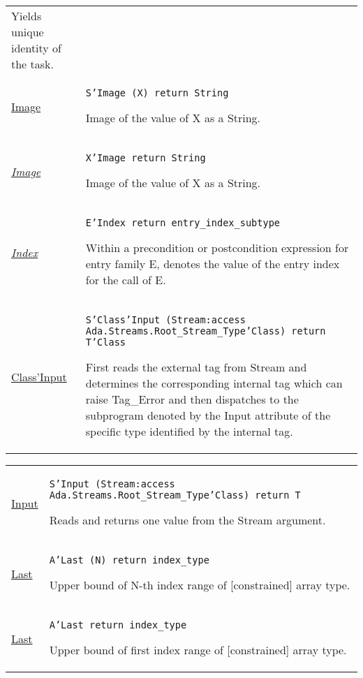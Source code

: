 \documentclass[english]{article}
\begin{document}
\begin{scriptsize}
\begin{multicols*}{3}
\begin{tabular}{@{}p{2cm}p{6.5cm}}
   Yields unique identity of the task.\\

   \href{http://www.ada-auth.org/standards/22rm/html/RM-K-2.html}{Image} & \texttt{S'Image (X) return String}

   Image of the value of X as a String.\\

   \href{http://www.ada-auth.org/standards/22rm/html/RM-K-2.html}{\textit{Image}} & \texttt{X'Image return String}

   Image of the value of X as a String.\\

   \href{http://www.ada-auth.org/standards/22rm/html/RM-K-2.html}{\textit{Index}} & \texttt{E'Index return entry\_index\_subtype}

   Within a precondition or postcondition expression for entry family E, denotes the value of the entry index for the call of E.\\

   \href{http://www.ada-auth.org/standards/22rm/html/RM-K-2.html}{Class'Input} & \texttt{S'Class'Input (Stream:access Ada.Streams.Root\_Stream\_Type'Class) return T'Class}

   First reads the external tag from Stream and determines the corresponding internal tag which can raise Tag\_Error and then dispatches to the subprogram denoted by the Input attribute of the specific type identified by the internal tag.\\

\end{tabular}
\begin{tabular}{@{}p{2cm}p{6.5cm}}

   \href{http://www.ada-auth.org/standards/22rm/html/RM-K-2.html}{Input} & \texttt{S'Input (Stream:access Ada.Streams.Root\_Stream\_Type'Class) return T}

   Reads and returns one value from the Stream argument.\\

   \href{http://www.ada-auth.org/standards/22rm/html/RM-K-2.html}{Last} & \texttt{A'Last (N) return index\_type}

   Upper bound of N-th index range of [constrained] array type.\\

   \href{http://www.ada-auth.org/standards/22rm/html/RM-K-2.html}{Last} & \texttt{A'Last return index\_type}

   Upper bound of first index range of [constrained] array type.\\


\end{tabular}
\end{multicols*}
\end{scriptsize}
\end{document}
